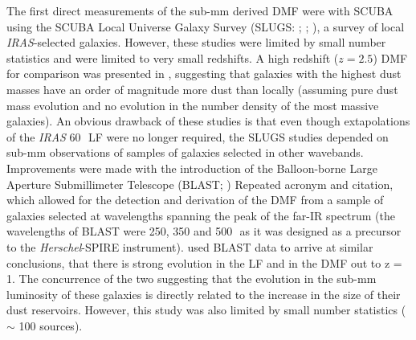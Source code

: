 The first direct measurements of the sub-mm derived DMF were with SCUBA using the SCUBA Local Universe Galaxy Survey (SLUGS: \citealt{Dunne_2000}; \citealt{Dunne_2001}; \citealt{Vlahakis_2005}), a survey of local \textit{IRAS}-selected galaxies. However, these studies were limited by small number statistics and were limited to very small redshifts. A high redshift ($z = 2.5$) DMF for comparison was presented in \citealt{Dunne_2003}, suggesting that galaxies with the highest dust masses have an order of magnitude more dust than locally (assuming pure dust mass evolution and no evolution in the number density of the most massive galaxies). An obvious drawback of these studies is that even though extapolations of the \textit{IRAS} 60\,\micron\ LF were no longer required, the SLUGS studies depended on sub-mm observations of samples of galaxies selected in other wavebands. Improvements were made with the introduction of the Balloon-borne Large Aperture Submillimeter Telescope (BLAST; \citealt{Devlin_2009}) {\color{red}Repeated acronym and citation}, which allowed for the detection and derivation of the DMF from a sample of galaxies selected at wavelengths spanning the peak of the far-IR spectrum (the wavelengths of BLAST were 250, 350 and 500\,\micron\, as it was designed as a precursor to the \textit{Herschel}-SPIRE instrument). \citealt{Eales_2009} used BLAST data to arrive at similar conclusions, that there is strong evolution in the LF and in the DMF out to z = 1. The concurrence of the two suggesting that the evolution in the sub-mm luminosity of these galaxies is directly related to the increase in the size of their dust reservoirs. However, this study was also limited by small number statistics ($\sim$ 100 sources).

